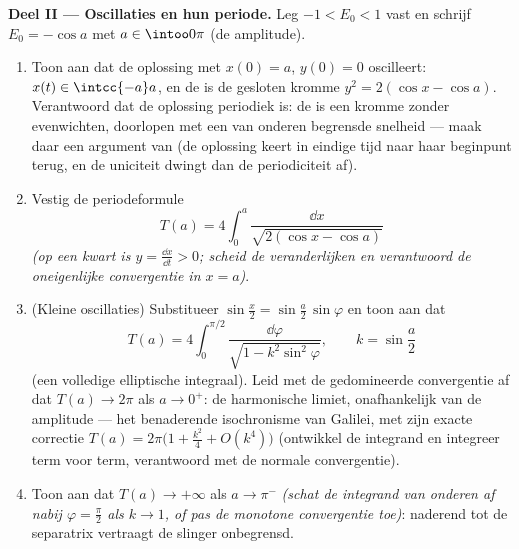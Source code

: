 \begin{problem}
\medskip
\noindent\textbf{Deel II --- Oscillaties en hun periode.} Leg $-1
< E_0 < 1$ vast en schrijf $E_0 = -\cos a$ met $a \in \intoo0\pi$
(de amplitude).
\begin{enumerate}[resume]
  \item Toon aan dat de oplossing met $x(0) = a$, $y(0) = 0$
        oscilleert: $x(t) \in \intcc{-a}a$, en de  is de
        gesloten kromme $y^2 = 2(\cos x - \cos a)$. Verantwoord
        dat de oplossing periodiek is: de  is een 
        kromme zonder evenwichten, doorlopen met een van onderen
        begrensde snelheid --- maak daar een argument van (de
        oplossing keert in eindige tijd naar haar beginpunt
        terug, en de uniciteit dwingt dan de periodiciteit af).
  \item Vestig de periodeformule
        \[
        T(a) = 4\int_0^{a}\frac{\dd x}{\sqrt{2(\cos x -
        \cos a)}}
        \]
        \emph{(op een kwart  is $y = \frac{\dd x}{\dd t} >
        0$; scheid de veranderlijken en verantwoord de
        oneigenlijke convergentie in $x = a$)}.
  \item (Kleine oscillaties) Substitueer $\sin\frac x2 =
        \sin\frac a2\,\sin\varphi$ en toon aan dat
        \[
        T(a) = 4\int_0^{\pi/2}\frac{\dd\varphi}{\sqrt{1 -
        k^2\sin^2\varphi}},
        \qquad k = \sin\frac a2
        \]
        (een volledige elliptische integraal). Leid met de
        gedomineerde convergentie af dat $T(a) \to 2\pi$ als $a
        \to 0^+$: de harmonische limiet, onafhankelijk van de
        amplitude --- het benaderende isochronisme van Galilei,
        met zijn exacte correctie $T(a) = 2\pi\bigl(1 +
        \frac{k^2}4 + O(k^4)\bigr)$ (ontwikkel de integrand en
        integreer term voor term, verantwoord met de normale
        convergentie).
  \item Toon aan dat $T(a) \to +\infty$ als $a \to \pi^-$
        \emph{(schat de integrand van onderen af nabij $\varphi =
        \frac\pi2$ als $k \to 1$, of pas de monotone convergentie
        toe)}: naderend tot de separatrix vertraagt de slinger
        onbegrensd.
\end{enumerate}


\end{problem}
